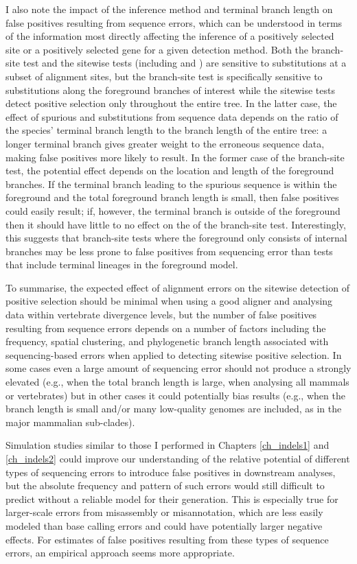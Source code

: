 I also note the impact of the inference method and terminal branch
length on false positives resulting from sequence errors, which can be
understood in terms of the information most directly affecting the
inference of a positively selected site or a positively selected gene
for a given detection method. Both the branch-site test and the
sitewise tests (including \slr and \pamlEight) are sensitive to
substitutions at a subset of alignment sites, but the branch-site test
is specifically sensitive to substitutions along the foreground
branches of interest while the sitewise tests detect positive
selection only throughout the entire tree. In the latter case, the
effect of spurious \syn and \nsyn substitutions from sequence data
depends on the ratio of the species' terminal branch length to the
branch length of the entire tree: a longer terminal branch gives
greater weight to the erroneous sequence data, making false positives
more likely to result. In the former case of the branch-site test, the
potential effect depends on the location and length of the foreground
branches. If the terminal branch leading to the spurious sequence is
within the foreground and the total foreground branch length is small,
then false positives could easily result; if, however, the terminal
branch is outside of the foreground then it should have little to no
effect on the \fpr of the branch-site test. Interestingly, this
suggests that branch-site tests where the foreground only consists of
internal branches may be less prone to false positives from sequencing
error than tests that include terminal lineages in the foreground
model.

To summarise, the expected effect of alignment errors on the sitewise
detection of positive selection should be minimal when using a good
aligner and analysing data within vertebrate divergence levels, but
the number of false positives resulting from sequence errors depends
on a number of factors including the frequency, spatial clustering,
and phylogenetic branch length associated with sequencing-based errors
when applied to detecting sitewise positive selection. In some cases
even a large amount of sequencing error should not produce a strongly
elevated \fpr (e.g., when the total branch length is large, when
analysing all mammals or vertebrates) but in other cases it could
potentially bias results (e.g., when the branch length is small and/or
many low-quality genomes are included, as in the major mammalian
sub-clades).

Simulation studies similar to those I performed in Chapters
\ref{ch_indels1} and \ref{ch_indels2} could improve our understanding
of the relative potential of different types of sequencing errors to
introduce false positives in downstream analyses, but the absolute
frequency and pattern of such errors would still difficult to predict
without a reliable model for their generation. This is especially true
for larger-scale errors from misassembly or misannotation, which are
less easily modeled than base calling errors and could have
potentially larger negative effects. For estimates of false positives
resulting from these types of sequence errors, an empirical approach
seems more appropriate.

